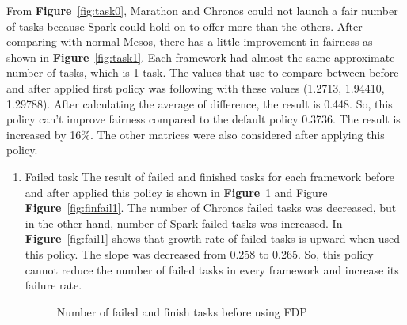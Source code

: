 \documentclass[12pt,oneside,openright,a4paper]{cpe-english-project}
\begin{document}
\hspace{10mm}From \textbf{Figure}~\ref{fig:task0}, Marathon and Chronos could not launch a fair number of tasks because Spark could hold on to offer more than the others. After comparing with normal Mesos, there has a little improvement in fairness as shown in \textbf{Figure}~\ref{fig:task1}. Each framework had almost the same approximate number of tasks, which is 1 task. The values that use to compare between before and after applied first policy was following with these values (1.2713, 1.94410, 1.29788). After calculating the average of difference, the result is 0.448. So, this policy can’t improve fairness compared to the default policy 0.3736. The result is increased by 16\%.
\newline
The other matrices were also considered after applying this policy.
\begin{enumerate}
  \item Failed task
  \newline
  The result of failed and finished tasks for each framework before and after applied this policy is shown in \textbf{Figure}~\ref{fig:finfail0-1} and Figure \textbf{Figure}~\ref{fig:finfail1}. The number of Chronos failed tasks was decreased, but in the other hand, number of Spark failed tasks was increased. In \textbf{Figure}~\ref{fig:fail1} shows that growth rate of failed tasks is upward when used this policy. The slope was decreased from 0.258 to 0.265. So, this policy cannot reduce the number of failed tasks in every framework and increase its failure rate.
  \begin{figure}[!h]\centering
    \setlength{\fboxrule}{0mm} %
    \setlength{\fboxsep}{0cm}
    \caption{Number of failed and finish tasks before using FDP}\label{fig:finfail0-1}
\end{figure}
\begin{figure}[!h]\centering
    \setlength{\fboxrule}{0mm} %
    \setlength{\fboxsep}{0cm}

\end{figure}
\end{enumerate}
\end{document}
